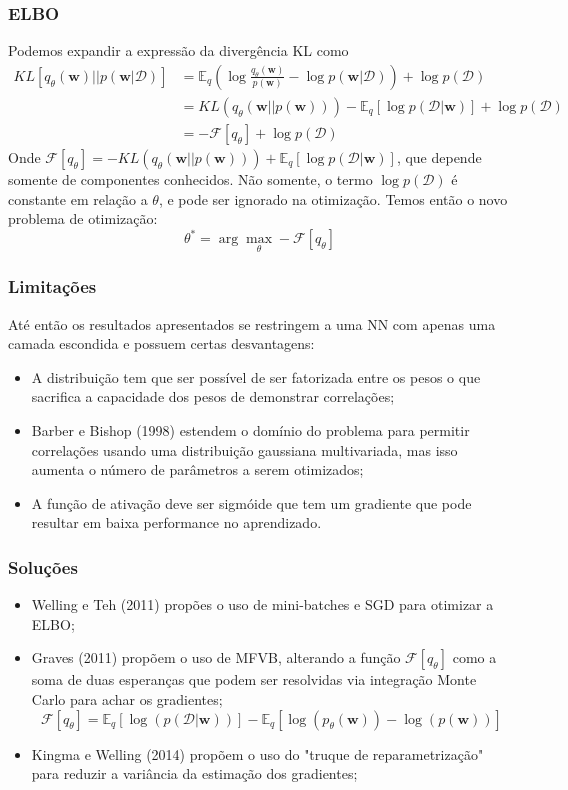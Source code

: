 \documentclass{beamer}
\begin{document}
\begin{frame}
    \frametitle{ELBO}

    Podemos expandir a expressão da divergência KL como
    \begin{align*}
        KL[q_\theta(\mathbf{w}) || p(\mathbf{w}|\mathcal{D})] &= \mathbb{E}_q \left(\log \frac{q_\theta(\mathbf{w})}{p(\mathbf{w})} - \log p(\mathbf{w}|\mathcal{D}) \right) + \log p(\mathcal{D})
        \\&= KL\left( q_\theta(\mathbf{w}||p(\mathbf{w})) \right) - \mathbb{E}_q \left[\log p(\mathcal{D}|\mathbf{w})\right] + \log p(\mathcal{D})
        \\&= - \mathcal{F}[q_\theta] + \log p(\mathcal{D})
    \end{align*}
    Onde $\mathcal{F}[q_\theta] = - KL\left( q_\theta(\mathbf{w}||p(\mathbf{w})) \right) + \mathbb{E}_q \left[\log p(\mathcal{D}|\mathbf{w})\right]$, que depende somente de componentes conhecidos. Não somente, o termo $\log p(\mathcal{D})$ é constante em relação a $\theta$, e pode ser ignorado na otimização. Temos então o novo problema de otimização:
    $$ \theta^* = \arg\max_\theta -\mathcal{F}[q_\theta] $$
\end{frame}


\begin{frame}
    \frametitle{Limitações}

    Até então os resultados apresentados se restringem a uma NN com apenas uma camada escondida e possuem certas desvantagens:
    \begin{itemize}
        \item A distribuição tem que ser possível de ser fatorizada entre os pesos o que sacrifica a capacidade dos pesos de demonstrar correlações;
        \item Barber e Bishop (1998) estendem o domínio do problema para permitir correlações usando uma distribuição gaussiana multivariada, mas isso aumenta o número de parâmetros a serem otimizados;
        \item A função de ativação deve ser sigmóide que tem um gradiente que pode resultar em baixa performance no aprendizado.
    \end{itemize}
\end{frame}

\begin{frame}
    \frametitle{Soluções}

    \begin{itemize}
        \item Welling e Teh (2011) propões o uso de mini-batches e SGD para otimizar a ELBO;
        \item Graves (2011) propõem o uso de MFVB, alterando a função $\mathcal{F}[q_\theta]$ como a soma de duas esperanças que podem ser resolvidas via integração Monte Carlo para achar os gradientes;
        $$ \mathcal{F}[q_\theta] = \mathbb{E}_q [\log(p(\mathcal{D}|\mathbf{w}))] - \mathbb{E}_q [\log(p_\theta(\mathbf{w})) - \log(p(\mathbf{w}))] $$
        \item Kingma e Welling (2014) propõem o uso do "truque de reparametrização" para reduzir a variância da estimação dos gradientes;
    \end{itemize}
\end{frame}
\end{document}
